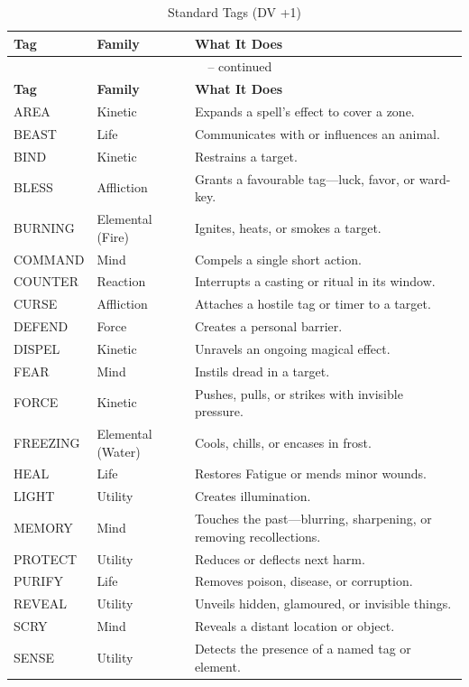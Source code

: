 \noindent
\begin{longtable}{p{} p{} p{}}
\caption{Standard Tags (DV +1)}\\
\midrule
\textbf{Tag} & \textbf{Family} & \textbf{What It Does}\\
\midrule
\endfirsthead
\multicolumn{3}{c}{\tablename\ \thetable{} -- continued}\\
\midrule
\textbf{Tag} & \textbf{Family} & \textbf{What It Does}\\
\midrule
\endhead
AREA & Kinetic & Expands a spell's effect to cover a zone. \\
BEAST & Life & Communicates with or influences an animal. \\
BIND & Kinetic & Restrains a target. \\
BLESS & Affliction & Grants a favourable tag---luck, favor, or ward- key. \\
BURNING & Elemental (Fire) & Ignites, heats, or smokes a target. \\
COMMAND & Mind & Compels a single short action. \\
COUNTER & Reaction & Interrupts a casting or ritual in its window. \\
CURSE & Affliction & Attaches a hostile tag or timer to a target. \\
DEFEND & Force & Creates a personal barrier. \\
DISPEL & Kinetic & Unravels an ongoing magical effect. \\
FEAR & Mind & Instils dread in a target. \\
FORCE & Kinetic & Pushes, pulls, or strikes with invisible pressure. \\
FREEZING & Elemental (Water) & Cools, chills, or encases in frost. \\
HEAL & Life & Restores Fatigue or mends minor wounds. \\
LIGHT & Utility & Creates illumination. \\
MEMORY & Mind & Touches the past---blurring, sharpening, or removing recollections. \\
PROTECT & Utility & Reduces or deflects next harm. \\
PURIFY & Life & Removes poison, disease, or corruption. \\
REVEAL & Utility & Unveils hidden, glamoured, or invisible things. \\
SCRY & Mind & Reveals a distant location or object. \\
SENSE & Utility & Detects the presence of a named tag or element. \\

\end{longtable}
